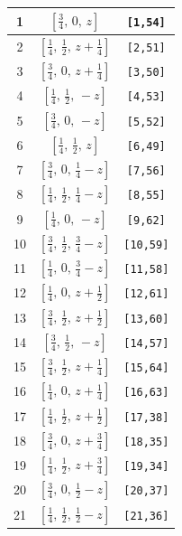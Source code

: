 \documentclass[fleqn,8pt]{jsarticle}
\begin{document}
\begin{longtable}{ccc}
1 & $\left[ \frac{3}{4},\, 0,\, z \right]$ & {\tt [1,54]} \\ \hline
2 & $\left[ \frac{1}{4},\, \frac{1}{2},\, z + \frac{1}{4} \right]$ & {\tt [2,51]} \\ \hline
3 & $\left[ \frac{3}{4},\, 0,\, z + \frac{1}{4} \right]$ & {\tt [3,50]} \\ \hline
4 & $\left[ \frac{1}{4},\, \frac{1}{2},\, - z \right]$ & {\tt [4,53]} \\ \hline
5 & $\left[ \frac{3}{4},\, 0,\, - z \right]$ & {\tt [5,52]} \\ \hline
6 & $\left[ \frac{1}{4},\, \frac{1}{2},\, z \right]$ & {\tt [6,49]} \\ \hline
7 & $\left[ \frac{3}{4},\, 0,\, \frac{1}{4} - z \right]$ & {\tt [7,56]} \\ \hline
8 & $\left[ \frac{1}{4},\, \frac{1}{2},\, \frac{1}{4} - z \right]$ & {\tt [8,55]} \\ \hline
9 & $\left[ \frac{1}{4},\, 0,\, - z \right]$ & {\tt [9,62]} \\ \hline
10 & $\left[ \frac{3}{4},\, \frac{1}{2},\, \frac{3}{4} - z \right]$ & {\tt [10,59]} \\ \hline
11 & $\left[ \frac{1}{4},\, 0,\, \frac{3}{4} - z \right]$ & {\tt [11,58]} \\ \hline
12 & $\left[ \frac{1}{4},\, 0,\, z + \frac{1}{2} \right]$ & {\tt [12,61]} \\ \hline
13 & $\left[ \frac{3}{4},\, \frac{1}{2},\, z + \frac{1}{2} \right]$ & {\tt [13,60]} \\ \hline
14 & $\left[ \frac{3}{4},\, \frac{1}{2},\, - z \right]$ & {\tt [14,57]} \\ \hline
15 & $\left[ \frac{3}{4},\, \frac{1}{2},\, z + \frac{1}{4} \right]$ & {\tt [15,64]} \\ \hline
16 & $\left[ \frac{1}{4},\, 0,\, z + \frac{1}{4} \right]$ & {\tt [16,63]} \\ \hline
17 & $\left[ \frac{1}{4},\, \frac{1}{2},\, z + \frac{1}{2} \right]$ & {\tt [17,38]} \\ \hline
18 & $\left[ \frac{3}{4},\, 0,\, z + \frac{3}{4} \right]$ & {\tt [18,35]} \\ \hline
19 & $\left[ \frac{1}{4},\, \frac{1}{2},\, z + \frac{3}{4} \right]$ & {\tt [19,34]} \\ \hline
20 & $\left[ \frac{3}{4},\, 0,\, \frac{1}{2} - z \right]$ & {\tt [20,37]} \\ \hline
21 & $\left[ \frac{1}{4},\, \frac{1}{2},\, \frac{1}{2} - z \right]$ & {\tt [21,36]} \\ \hline

\end{longtable}
\end{document}
